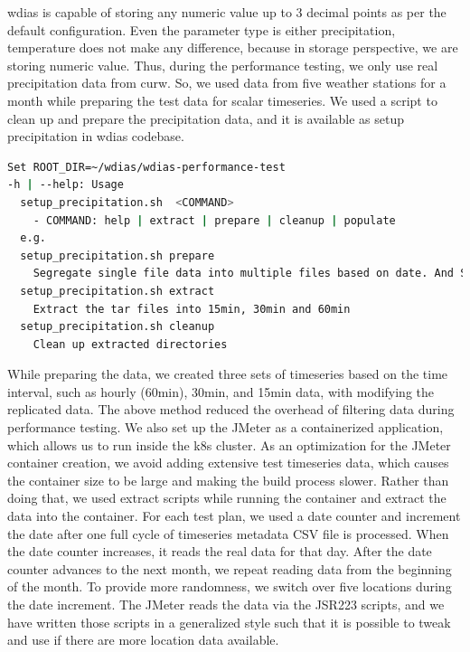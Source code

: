 \acrshort{wdias} is capable of storing any numeric value up to 3 decimal points as per the default configuration. Even the parameter type is either precipitation, temperature does not make any difference, because in storage perspective, we are storing numeric value. Thus, during the performance testing, we only use real precipitation data from \acrshort{curw}. So, we used data from five weather stations for a month while preparing the test data for scalar timeseries. We used a script to clean up and prepare the precipitation data, and it is available as setup precipitation in \acrshort{wdias} codebase.

\begin{lstlisting}[language=sh, caption=Preparation of precipitation data.]
Set ROOT_DIR=~/wdias/wdias-performance-test
-h | --help: Usage
  setup_precipitation.sh  <COMMAND>
    - COMMAND: help | extract | prepare | cleanup | populate
  e.g.
  setup_precipitation.sh prepare
    Segregate single file data into multiple files based on date. And Separate into main directories of 15min, 30min, 60min and create tar files
  setup_precipitation.sh extract
    Extract the tar files into 15min, 30min and 60min
  setup_precipitation.sh cleanup
    Clean up extracted directories
\end{lstlisting}

While preparing the data, we created three sets of timeseries based on the time interval, such as hourly (60min), 30min, and 15min data, with modifying the replicated data. The above method reduced the overhead of filtering data during performance testing. We also set up the JMeter as a containerized application, which allows us to run inside the k8s cluster. As an optimization for the JMeter container creation, we avoid adding extensive test timeseries data, which causes the container size to be large and making the build process slower. Rather than doing that, we used extract scripts while running the container and extract the data into the container. For each test plan, we used a date counter and increment the date after one full cycle of timeseries metadata CSV file is processed. When the date counter increases, it reads the real data for that day. After the date counter advances to the next month, we repeat reading data from the beginning of the month. To provide more randomness, we switch over five locations during the date increment. The JMeter reads the data via the JSR223 scripts, and we have written those scripts in a generalized style such that it is possible to tweak and use if there are more location data available.

